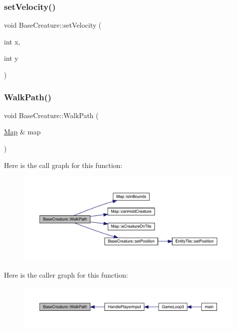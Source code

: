 \subsubsection{\texorpdfstring{set\+Velocity()}{setVelocity()}}
{\footnotesize\ttfamily void Base\+Creature\+::set\+Velocity (\begin{DoxyParamCaption}\item[{int}]{x,  }\item[{int}]{y }\end{DoxyParamCaption})}

\mbox{\label{class_base_creature_aaecab78bf5a5a5293079634e813f854f}} 
\subsubsection{\texorpdfstring{Walk\+Path()}{WalkPath()}}
{\footnotesize\ttfamily void Base\+Creature\+::\+Walk\+Path (\begin{DoxyParamCaption}\item[{\mbox{\hyperlink{class_map}{Map}} \&}]{map }\end{DoxyParamCaption})}

Here is the call graph for this function\+:
\nopagebreak
\begin{figure}[H]
\begin{center}
\leavevmode
\includegraphics[width=350pt]{d2/d3b/class_base_creature_aaecab78bf5a5a5293079634e813f854f_cgraph}
\end{center}
\end{figure}
Here is the caller graph for this function\+:
\nopagebreak
\begin{figure}[H]
\begin{center}
\leavevmode
\includegraphics[width=350pt]{d2/d3b/class_base_creature_aaecab78bf5a5a5293079634e813f854f_icgraph}
\end{center}
\end{figure}


